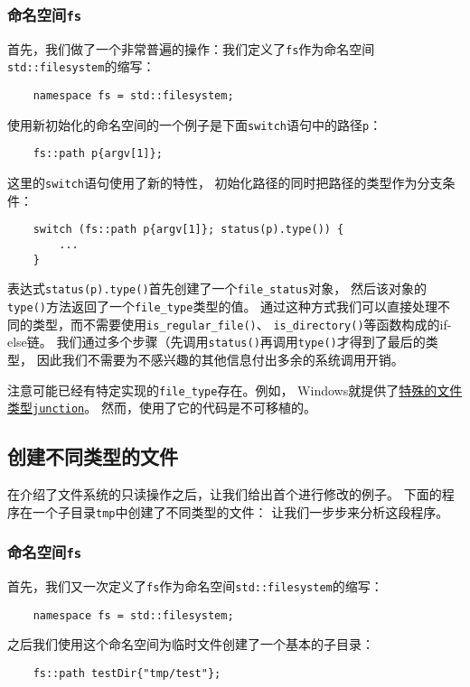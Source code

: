 \subsubsection{命名空间\texttt{fs}}
首先，我们做了一个非常普遍的操作：我们定义了\texttt{fs}作为命名空间
\texttt{std::filesystem}的缩写：
\begin{lstlisting}
    namespace fs = std::filesystem;
\end{lstlisting}
使用新初始化的命名空间的一个例子是下面\texttt{switch}语句中的路径\texttt{p}：
\begin{lstlisting}
    fs::path p{argv[1]};
\end{lstlisting}
这里的\texttt{switch}语句使用了新的特性，
初始化路径的同时把路径的类型作为分支条件：
\begin{lstlisting}
    switch (fs::path p{argv[1]}; status(p).type()) {
        ...
    }
\end{lstlisting}
表达式\texttt{status(p).type()}首先创建了一个\texttt{file\_status}对象，
然后该对象的\texttt{type()}方法返回了一个\texttt{file\_type}类型的值。
通过这种方式我们可以直接处理不同的类型，而不需要使用\texttt{is\_regular\_file()}、
\texttt{is\_directory()}等函数构成的if-else链。
我们通过多个步骤（先调用\texttt{status()}再调用\texttt{type()}才得到了最后的类型，
因此我们不需要为不感兴趣的其他信息付出多余的系统调用开销。

注意可能已经有特定实现的\texttt{file\_type}存在。例如，
Windows就提供了\hyperref[junction]{特殊的文件类型\texttt{junction}}。
然而，使用了它的代码是不可移植的。

\subsection{创建不同类型的文件}
在介绍了文件系统的只读操作之后，让我们给出首个进行修改的例子。
下面的程序在一个子目录\texttt{tmp}中创建了不同类型的文件：
让我们一步步来分析这段程序。

\subsubsection{命名空间\texttt{fs}}
首先，我们又一次定义了\texttt{fs}作为命名空间\texttt{std::filesystem}的缩写：
\begin{lstlisting}
    namespace fs = std::filesystem;
\end{lstlisting}
之后我们使用这个命名空间为临时文件创建了一个基本的子目录：
\begin{lstlisting}
    fs::path testDir{"tmp/test"};
\end{lstlisting}

